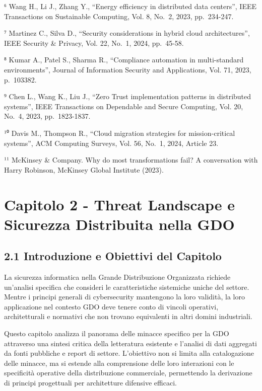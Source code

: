 \documentclass[12pt,a4paper,oneside]{book}
\begin{document}
⁶ Wang H., Li J., Zhang Y., ``Energy efficiency in distributed data
centers'', IEEE Transactions on Sustainable Computing, Vol. 8, No.~2,
2023, pp.~234-247.

⁷ Martinez C., Silva D., ``Security considerations in hybrid cloud
architectures'', IEEE Security \& Privacy, Vol. 22, No.~1, 2024,
pp.~45-58.

⁸ Kumar A., Patel S., Sharma R., ``Compliance automation in
multi-standard environments'', Journal of Information Security and
Applications, Vol. 71, 2023, p.~103382.

⁹ Chen L., Wang K., Liu J., ``Zero Trust implementation patterns in
distributed systems'', IEEE Transactions on Dependable and Secure
Computing, Vol. 20, No.~4, 2023, pp.~1823-1837.

¹⁰ Davis M., Thompson R., ``Cloud migration strategies for
mission-critical systems'', ACM Computing Surveys, Vol. 56, No.~1, 2024,
Article 23.

¹¹ McKinsey \& Company. Why do most transformations fail? A conversation
with Harry Robinson, McKinsey Global Institute (2023).

\chapter{Capitolo 2 - Threat Landscape e Sicurezza Distribuita nella
GDO}\label{capitolo-2---threat-landscape-e-sicurezza-distribuita-nella-gdo}

\section{2.1 Introduzione e Obiettivi del
Capitolo}\label{introduzione-e-obiettivi-del-capitolo}

La sicurezza informatica nella Grande Distribuzione Organizzata richiede
un'analisi specifica che consideri le caratteristiche sistemiche uniche
del settore. Mentre i principi generali di cybersecurity mantengono la
loro validità, la loro applicazione nel contesto GDO deve tenere conto
di vincoli operativi, architetturali e normativi che non trovano
equivalenti in altri domini industriali.

Questo capitolo analizza il panorama delle minacce specifico per la GDO
attraverso una sintesi critica della letteratura esistente e l'analisi
di dati aggregati da fonti pubbliche e report di settore. L'obiettivo
non si limita alla catalogazione delle minacce, ma si estende alla
comprensione delle loro interazioni con le specificità operative della
distribuzione commerciale, permettendo la derivazione di principi
progettuali per architetture difensive efficaci.
\end{document}
